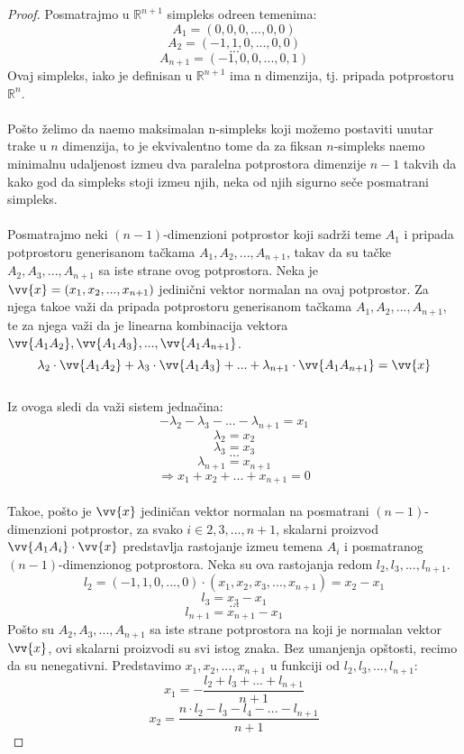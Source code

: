 \documentclass[11pt,letter]{article}
\begin{document}
\begin{proof}
Posmatrajmo u $\mathbb{R}^{n+1}$ simpleks odre\dj en temenima:
$$A_1=(0, 0, 0, ..., 0, 0)$$
$$A_2=(-1, 1, 0, ..., 0, 0)$$
$$...$$
$$A_{n+1}=(-1,0,0,..., 0, 1)$$
Ovaj simpleks, iako je definisan u $\mathbb{R}^{n+1}$ ima n dimenzija, tj. pripada potprostoru $\mathbb{R}^n$. 
 \\
\\
\indent Po\v sto \v zelimo da na\dj emo maksimalan n-simpleks koji mo\v zemo postaviti unutar trake u $n$ dimenzija, to je ekvivalentno tome da za fiksan $n$-simpleks na\dj emo minimalnu udaljenost izme\dj u dva paralelna potprostora dimenzije $n-1$ takvih da kako god da simpleks stoji izme\dj u njih, neka od njih sigurno se\v ce posmatrani simpleks.
\\
\\
\indent Posmatrajmo neki $(n-1)$-dimenzioni potprostor koji sadr\v zi teme $A_1$ i pripada potprostoru generisanom ta\v ckama $A_1, A_2,..., A_{n+1}$, takav da su ta\v cke $A_2, A_3,..., A_{n+1}$ sa iste strane ovog potprostora. Neka je $\vv{x}=(x_1, x_2,..., x_{n+1})$ jedini\v cni vektor normalan na ovaj potprostor. Za njega tako\dj e va\v zi da pripada potprostoru generisanom ta\v ckama $A_1, A_2,..., A_{n+1}$, te za njega va\v zi da je linearna kombinacija vektora $\vv{A_1A_2}, \vv{A_1A_3},...,\vv{A_1 A_{n+1}}$.
\\
$$\lambda_2 \cdot \vv{A_1A_2}+\lambda_3 \cdot \vv{A_1A_3}+...+\lambda_{n+1}\cdot \vv{A_1A_{n+1}}=\vv{x}$$
\\
Iz ovoga sledi da va\v zi sistem jedna\v cina:
$$ -\lambda_2-\lambda_3-...-\lambda_{n+1}=x_1$$
$$\lambda_2=x_2$$
$$\lambda_3=x_3$$
$$...$$
$$\lambda_{n+1}=x_{n+1}$$
$$\Rightarrow x_1+x_2+...+x_{n+1}=0 $$
\\
Tako\dj e, po\v sto je $\vv{x}$ jedini\v can vektor normalan na posmatrani $(n-1)$-dimenzioni potprostor, za svako $i\in {2, 3,..., n+1}$, skalarni proizvod $\vv{A_1A_i}\cdot \vv{x}$ predstavlja rastojanje izme\dj u temena $A_i$ i posmatranog $(n-1)$-dimenzionog potprostora. Neka su ova rastojanja redom $l_2, l_3,..., l_{n+1}$.
$$l_2=(-1, 1, 0,..., 0)\cdot (x_1, x_2, x_3,..., x_{n+1})=x_2-x_1$$
$$l_3=x_3-x_1$$
$$...$$
$$l_{n+1}=x_{n+1}-x_1$$
Po\v sto su $A_2, A_3,..., A_{n+1}$ sa iste strane potprostora na koji je normalan vektor $\vv{x}$, ovi skalarni proizvodi su svi istog znaka. Bez umanjenja op\v stosti, recimo da su nenegativni.
Predstavimo $x_1, x_2,..., x_{n+1}$ u funkciji od $l_2, l_3,..., l_{n+1}$:
$$x_1=-\frac{l_2+l_3+...+l_{n+1}}{n+1}$$
$$x_2=\frac{n\cdot l_2-l_3-l_4-...-l_{n+1}}{n+1}$$

\end{proof}
\end{document}
